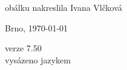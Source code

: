 \vspace*{\fill}
\hspace{10mm}obálku nakreslila Ivana Vlčková\\
\begin{otherlanguage}{czech}
Brno, \today\\
\end{otherlanguage}
verze 7.50\\
vysázeno jazykem \LaTeXe
\vspace{2cm}
\newpage
